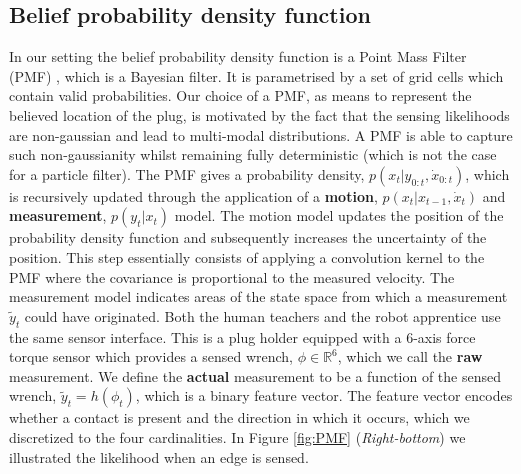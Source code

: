 \subsection{Belief probability density function}
In our setting the belief probability density function is a Point Mass Filter (PMF) \cite[p.87]{Bergman99recursivebayesian},
which is a  Bayesian filter. It is parametrised by a set of grid cells  which contain valid probabilities.
Our choice of a PMF, as means to represent the believed location of the plug, is motivated by the fact that the 
sensing likelihoods are non-gaussian and lead to multi-modal distributions. A PMF is able to capture such non-gaussianity whilst
remaining fully deterministic (which is not the case for a particle filter).
The PMF gives a probability density, $p(x_t|y_{0:t},\dot{x}_{0:t})$, which is recursively updated through the 
application of a \textbf{motion}, $p(x_t|x_{t-1},\dot{x}_t)$ and \textbf{measurement}, $p(y_t|x_t)$ model. 
The motion model updates the position of the probability density function and subsequently increases the uncertainty 
of the position. This step essentially consists of applying a convolution kernel to the PMF where the covariance 
is proportional to the measured velocity.
The measurement model indicates areas of the state space from which a measurement $\tilde{y}_t$ could have originated. 
Both the human teachers and the robot apprentice use the same sensor interface. This is a plug holder
equipped with a 6-axis force torque sensor which provides a sensed wrench, $\phi \in \mathbb{R}^6$, which we
call the \textbf{raw} measurement. We define the \textbf{actual} measurement to be a function of the sensed wrench, 
$\tilde{y}_t = h(\phi_t)$, which is a binary feature vector. The feature vector encodes whether a contact is present 
and the direction in which it occurs, which we discretized to the four cardinalities.
In Figure \ref{fig:PMF} (\textit{Right-bottom}) we illustrated the likelihood when an edge is sensed.


